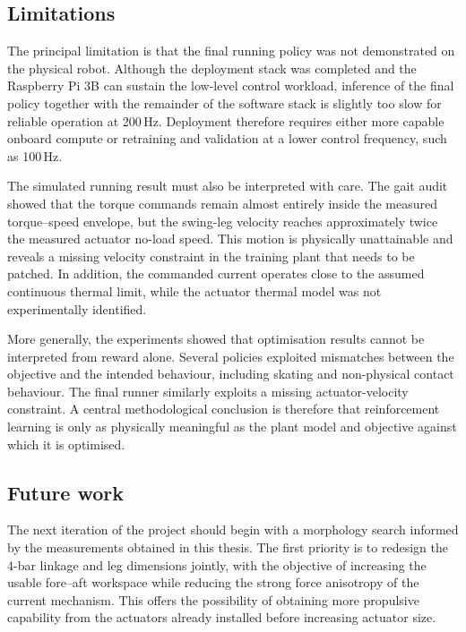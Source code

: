 \subsection{Limitations}

The principal limitation is that the final running policy was not demonstrated on the physical robot.
Although the deployment stack was completed and the Raspberry Pi 3B can sustain the low-level control workload, inference of the final policy together with the remainder of the software stack is slightly too slow for reliable operation at 200\,Hz.
Deployment therefore requires either more capable onboard compute or retraining and validation at a lower control frequency, such as 100\,Hz.

The simulated running result must also be interpreted with care.
The gait audit showed that the torque commands remain almost entirely inside the measured torque--speed envelope, but the swing-leg velocity reaches approximately twice the measured actuator no-load speed.
This motion is physically unattainable and reveals a missing velocity constraint in the training plant that needs to be patched.
In addition, the commanded current operates close to the assumed continuous thermal limit, while the actuator thermal model was not experimentally identified.

More generally, the experiments showed that optimisation results cannot be interpreted from reward alone.
Several policies exploited mismatches between the objective and the intended behaviour, including skating and non-physical contact behaviour.
The final runner similarly exploits a missing actuator-velocity constraint.
A central methodological conclusion is therefore that reinforcement learning is only as physically meaningful as the plant model and objective against which it is optimised.


\subsection{Future work}

The next iteration of the project should begin with a morphology search informed by the measurements obtained in this thesis.
The first priority is to redesign the 4-bar linkage and leg dimensions jointly, with the objective of increasing the usable fore--aft workspace while reducing the strong force anisotropy of the current mechanism.
This offers the possibility of obtaining more propulsive capability from the actuators already installed before increasing actuator size.

